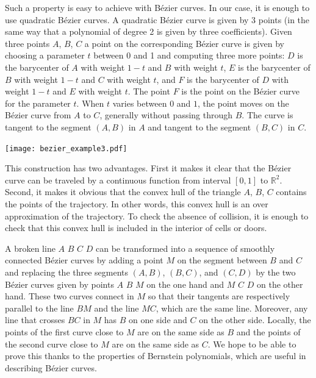\documentclass{llncs}
\begin{document}
Such a property is easy to achieve with Bézier curves.  In our case,
it is enough to use quadratic Bézier curves.  A quadratic Bézier curve
is given by 3 points (in the same way that a polynomial of degree 2 is
given by three coefficients).  Given three points \(A\), \(B\), \(C\)
a point on the corresponding Bézier curve is given by choosing a
parameter \(t\) between 0 and 1 and computing three more points:
\(D\) is the barycenter of \(A\) with weight \(1 - t\) and \(B\) with
weight \(t\), \(E\) is the barycenter of \(B\) with weight \(1 - t\)
and \(C\) with weight \(t\), and \(F\) is the barycenter of \(D\) with
weight \(1-t\) and \(E\) with weight \(t\).  The point \(F\) is the
point on the Bézier curve for the parameter \(t\).  When \(t\) varies
between \(0\) and \(1\), the point moves on the Bézier curve from \(A\)
to \(C\), generally without passing through \(B\).  The curve
is tangent to the segment \((A,B)\) in \(A\) and tangent to
the segment \((B,C)\) in \(C\).

\begin{center}
\texttt{[image: bezier\_example3.pdf]}
\end{center}

This construction has two advantages.  First it makes it clear that
the Bézier curve can be traveled by a continuous function from
interval \([0,1]\) to \({\mathbb R}^2\).  Second,
it makes it obvious that the convex hull of
the triangle \(A\), \(B\), \(C\) contains the points of the
trajectory.  In other words, this convex hull is an over approximation of
the trajectory.  To check the absence of collision, it is enough to check that
this convex hull is included in the interior of cells or doors.

A broken line \(A\) \(B\) \(C\) \(D\) can be transformed into a sequence
of smoothly connected Bézier
curves by adding a point \(M\) on the segment between \(B\) and \(C\)
and replacing the three segments \((A, B)\), \((B, C)\), and \((C,
D)\) by the two Bézier curves given by points \(A\) \(B\) \(M\) on the
one hand and \(M\) \(C\) \(D\) on the other hand.  These two curves
connect in \(M\) so that their tangents are respectively parallel to
the line \(BM\) and the line \(MC\), which are the same line.  Moreover,
any line that crosses \(BC\) in \(M\) has \(B\) on one side and \(C\) on the
other side.  Locally, the points of the first curve close to \(M\) are on the
same side as \(B\) and the points of the second curve close to \(M\) are on
the same side as \(C\).  We hope to be able to prove this thanks to the
properties of Bernstein polynomials, which are useful in describing 
Bézier curves.
\end{document}
